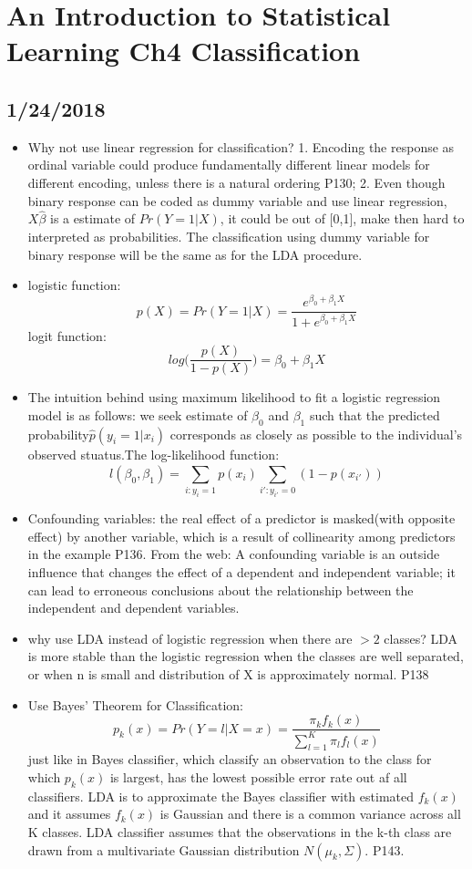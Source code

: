 \documentclass[a4paper, 12pt]{article}
\begin{document}
\section*{An Introduction to Statistical Learning Ch4 Classification}
\subsection{1/24/2018}
\begin{itemize}
	\item Why not use linear regression for classification? 1. Encoding the response as ordinal variable could produce fundamentally different linear models for different encoding, unless there is a natural ordering P130; 2. Even though binary response can be coded as dummy variable and use linear regression, $X\hat{\beta}$ is a estimate of $Pr(Y=1|X)$, it could be out of [0,1], make then hard to interpreted as probabilities. The classification using dummy variable for binary response will be the same as for the LDA procedure. 
	\item logistic function:
	\[p(X)=Pr(Y=1|X)=\frac{e^{\beta_0+\beta_1X}}{1+e^{\beta_0+\beta_1X}}
	\]
	logit function:
	\[log \big( \frac{p(X)}{1-p(X)} \big)=\beta_0+\beta_1X
	\]
	\item The intuition behind using maximum likelihood to fit a logistic regression model is as follows: we seek estimate of $\beta_0$ and $\beta_1$ such that the predicted probability$\hat{p}(y_i=1|x_i)$ corresponds as closely as possible to the individual's observed stuatus.The log-likelihood function:
	\[l(\beta_0,\beta_1)=\sum_{i:y_i=1}^{}p(x_i)\sum_{i':y_{i'}=0}^{}(1-p(x_{i'}))
	\]
	\item Confounding variables: the real effect of a predictor is masked(with opposite effect) by another variable, which is a result of collinearity among predictors in the example P136. From the web: A confounding variable is an outside influence that changes the effect of a dependent and independent variable; it can lead to erroneous conclusions about the relationship between the independent and dependent variables. 
	\item why use LDA instead of logistic regression when there are $> 2$ classes? LDA is more stable than the logistic regression when the classes are well separated, or when n is small and distribution of X is approximately normal. P138
	\item Use Bayes' Theorem for Classification: 
	\[ p_k(x)=Pr(Y=l|X=x)=\frac{\pi_kf_k(x)}{\sum_{l=1}^{K}\pi_lf_l(x)}
	\]
	just like in Bayes classifier, which classify an observation to the class for which $p_k(x)$ is largest, has the lowest possible error rate out af all classifiers. LDA is to approximate the Bayes classifier with estimated $f_k(x)$ and it assumes $f_k(x)$ is Gaussian and there is a common variance across all K classes. LDA classifier assumes that the observations in the k-th class are drawn from a multivariate Gaussian distribution $N(\mu_k,\Sigma)$. P143.

\end{itemize}
\end{document}
